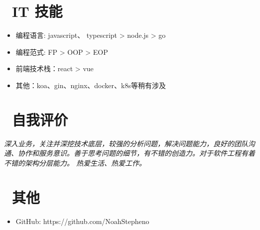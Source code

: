 \documentclass{resume}
\begin{document}

\section{\faCogs\ IT 技能}
\begin{itemize}[parsep=0.5ex]
  \item 编程语言: javascript、 typescript > node.js > go 
  \item 编程范式: FP > OOP > EOP
  \item 前端技术栈：react > vue
  \item 其他：koa、gin、nginx、docker、k8s等稍有涉及
\end{itemize}

\section{\faHeartO\ 自我评价}
\textit{深入业务，关注并深挖技术底层，较强的分析问题，解决问题能力，良好的团队沟通、协作和服务意识。善于思考问题的细节，有不错的创造力。对于软件工程有着不错的架构分层能力。
热爱生活、热爱工作。}

\section{\faInfo\ 其他}
\begin{itemize}[parsep=0.5ex]
  \item GitHub: https://github.com/NoahStepheno
\end{itemize}

%
%
\end{document}
